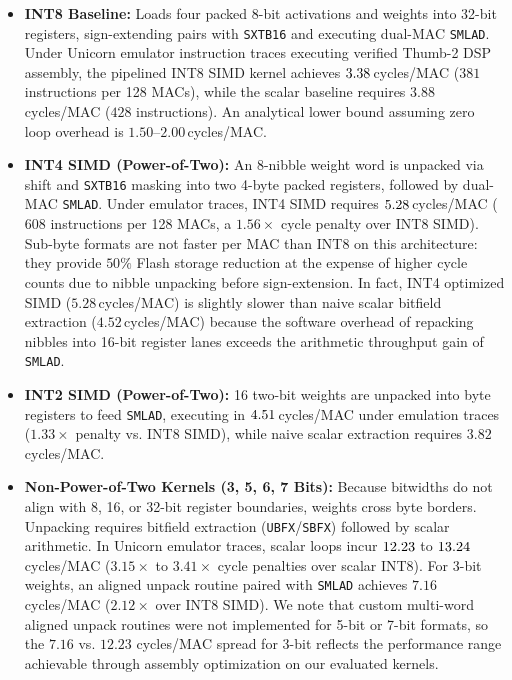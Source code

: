 \documentclass{ieeeaccess}
\begin{document}
\begin{itemize}
    \item \textbf{INT8 Baseline:} Loads four packed 8-bit activations and weights into 32-bit registers, sign-extending pairs with \texttt{SXTB16} and executing dual-MAC \texttt{SMLAD}. Under Unicorn emulator instruction traces executing verified Thumb-2 DSP assembly, the pipelined INT8 SIMD kernel achieves $3.38$\,cycles/MAC ($381$ instructions per 128 MACs), while the scalar baseline requires $3.88$\,cycles/MAC ($428$ instructions). An analytical lower bound assuming zero loop overhead is $1.50$--$2.00$\,cycles/MAC.
    \item \textbf{INT4 SIMD (Power-of-Two):} An 8-nibble weight word is unpacked via shift and \texttt{SXTB16} masking into two 4-byte packed registers, followed by dual-MAC \texttt{SMLAD}. Under emulator traces, INT4 SIMD requires $5.28$\,cycles/MAC ($608$ instructions per 128 MACs, a $1.56\times$ cycle penalty over INT8 SIMD). Sub-byte formats are not faster per MAC than INT8 on this architecture: they provide $50\%$ Flash storage reduction at the expense of higher cycle counts due to nibble unpacking before sign-extension. In fact, INT4 optimized SIMD ($5.28$\,cycles/MAC) is slightly slower than naive scalar bitfield extraction ($4.52$\,cycles/MAC) because the software overhead of repacking nibbles into 16-bit register lanes exceeds the arithmetic throughput gain of \texttt{SMLAD}.
    \item \textbf{INT2 SIMD (Power-of-Two):} 16 two-bit weights are unpacked into byte registers to feed \texttt{SMLAD}, executing in $4.51$\,cycles/MAC under emulation traces ($1.33\times$ penalty vs. INT8 SIMD), while naive scalar extraction requires $3.82$\,cycles/MAC.
    \item \textbf{Non-Power-of-Two Kernels (3, 5, 6, 7 Bits):} Because bitwidths do not align with 8, 16, or 32-bit register boundaries, weights cross byte borders. Unpacking requires bitfield extraction (\texttt{UBFX}/\texttt{SBFX}) followed by scalar arithmetic. In Unicorn emulator traces, scalar loops incur $12.23$ to $13.24$\,cycles/MAC ($3.15\times$ to $3.41\times$ cycle penalties over scalar INT8). For 3-bit weights, an aligned unpack routine paired with \texttt{SMLAD} achieves $7.16$\,cycles/MAC ($2.12\times$ over INT8 SIMD). We note that custom multi-word aligned unpack routines were not implemented for 5-bit or 7-bit formats, so the $7.16$ vs. $12.23$ cycles/MAC spread for 3-bit reflects the performance range achievable through assembly optimization on our evaluated kernels.
\end{itemize}
\end{document}
